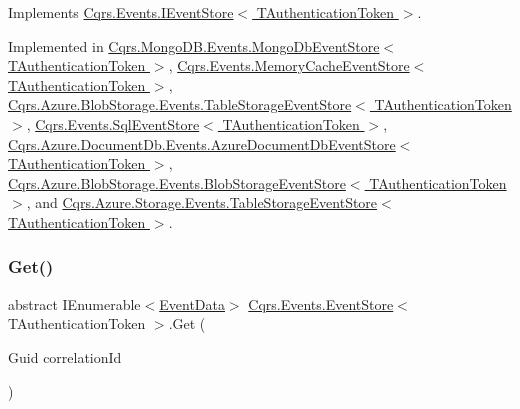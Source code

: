 Implements \hyperlink{interfaceCqrs_1_1Events_1_1IEventStore_ae02ef6c804d0c4a92705a447bc4b2214_ae02ef6c804d0c4a92705a447bc4b2214}{Cqrs.\+Events.\+I\+Event\+Store$<$ T\+Authentication\+Token $>$}.



Implemented in \hyperlink{classCqrs_1_1MongoDB_1_1Events_1_1MongoDbEventStore_a7a1ac8e59dc5bff0bb6562fb4f43e8df_a7a1ac8e59dc5bff0bb6562fb4f43e8df}{Cqrs.\+Mongo\+D\+B.\+Events.\+Mongo\+Db\+Event\+Store$<$ T\+Authentication\+Token $>$}, \hyperlink{classCqrs_1_1Events_1_1MemoryCacheEventStore_a1391c260f52f5cf18058cf88ad2d16de_a1391c260f52f5cf18058cf88ad2d16de}{Cqrs.\+Events.\+Memory\+Cache\+Event\+Store$<$ T\+Authentication\+Token $>$}, \hyperlink{classCqrs_1_1Azure_1_1BlobStorage_1_1Events_1_1TableStorageEventStore_a420c94c86d8d1c2959aee8602f43c0c0_a420c94c86d8d1c2959aee8602f43c0c0}{Cqrs.\+Azure.\+Blob\+Storage.\+Events.\+Table\+Storage\+Event\+Store$<$ T\+Authentication\+Token $>$}, \hyperlink{classCqrs_1_1Events_1_1SqlEventStore_a7e32a08a015642a5bc1cefa6998e6f11_a7e32a08a015642a5bc1cefa6998e6f11}{Cqrs.\+Events.\+Sql\+Event\+Store$<$ T\+Authentication\+Token $>$}, \hyperlink{classCqrs_1_1Azure_1_1DocumentDb_1_1Events_1_1AzureDocumentDbEventStore_a54f298fdde141166e23f01e4911bf188_a54f298fdde141166e23f01e4911bf188}{Cqrs.\+Azure.\+Document\+Db.\+Events.\+Azure\+Document\+Db\+Event\+Store$<$ T\+Authentication\+Token $>$}, \hyperlink{classCqrs_1_1Azure_1_1BlobStorage_1_1Events_1_1BlobStorageEventStore_ab68b594c54ae5a79e3b8d5db1902752d_ab68b594c54ae5a79e3b8d5db1902752d}{Cqrs.\+Azure.\+Blob\+Storage.\+Events.\+Blob\+Storage\+Event\+Store$<$ T\+Authentication\+Token $>$}, and \hyperlink{classCqrs_1_1Azure_1_1Storage_1_1Events_1_1TableStorageEventStore_a089514182da7a70f35f9237c521c49f0_a089514182da7a70f35f9237c521c49f0}{Cqrs.\+Azure.\+Storage.\+Events.\+Table\+Storage\+Event\+Store$<$ T\+Authentication\+Token $>$}.

\mbox{\label{classCqrs_1_1Events_1_1EventStore_a0096646f5dff730b0041b9469719c420_a0096646f5dff730b0041b9469719c420}} 
\subsubsection{\texorpdfstring{Get()}{Get()}\hspace{0.1cm}{\footnotesize\ttfamily [2/2]}}
{\footnotesize\ttfamily abstract I\+Enumerable$<$\hyperlink{classCqrs_1_1Events_1_1EventData}{Event\+Data}$>$ \hyperlink{classCqrs_1_1Events_1_1EventStore}{Cqrs.\+Events.\+Event\+Store}$<$ T\+Authentication\+Token $>$.Get (\begin{DoxyParamCaption}\item[{Guid}]{correlation\+Id }\end{DoxyParamCaption})\hspace{0.3cm}{\ttfamily [pure virtual]}}



